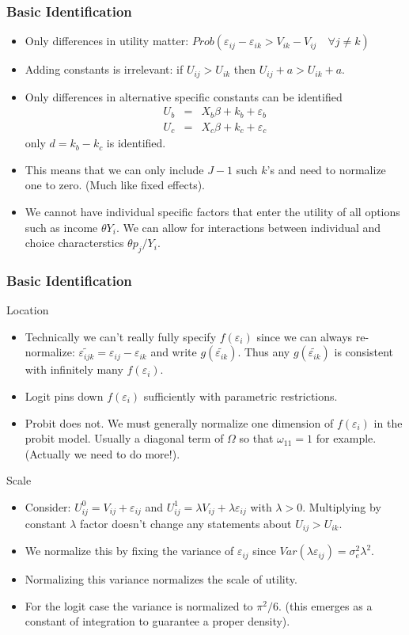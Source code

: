 \documentclass[xcolor=pdftex,dvipsnames,table,mathserif]{beamer}
\begin{document}
\begin{frame}
\frametitle{Basic Identification}
\small
\begin{itemize}
\item Only differences in utility matter: $Prob( \varepsilon_{ij}-\varepsilon_{ik} > V_{ik} - V_{ij} \quad \forall j \neq k)$
\item Adding constants is irrelevant: if $U_{ij} > U_{ik}$ then $U_{ij} + a > U_{ik} + a$.
\item Only differences in alternative specific constants can be identified
\begin{eqnarray*}
U_b &=& X_b \beta + k_b  + \varepsilon_b\\
U_c &=& X_c \beta + k_c  + \varepsilon_c
\end{eqnarray*}
only $d = k_b - k_c$ is identified.
\item This means that we can only include $J-1$ such $k$'s and need to normalize one to zero. (Much like fixed effects).
\item We cannot have individual specific factors that enter the utility of all options such as income $\theta Y_i$. We can allow for interactions between individual and choice characterstics $\theta p_{j}/ Y_i$.
\end{itemize}
\end{frame}

\begin{frame}
\frametitle{Basic Identification}
Location
\begin{itemize}
\item Technically we can't really fully specify $f(\varepsilon_i)$ since we can always re-normalize: $\widetilde{\varepsilon_{ijk}} = \varepsilon_{ij} - \varepsilon_{ik}$ and write $g(\widetilde{\varepsilon_{ik}})$. Thus any $g(\widetilde{\varepsilon_{ik}})$ is consistent with infinitely many $f(\varepsilon_i)$.
\item Logit pins down $f(\varepsilon_i)$ sufficiently with parametric restrictions.
\item Probit does not. We must generally normalize one dimension of $f(\varepsilon_i)$ in the probit model. Usually a diagonal term of $\Omega$ so that $\omega_{11} =1$ for example. (Actually we need to do more!).
\end{itemize}
Scale
\begin{itemize}
\item Consider: $U_{ij}^0 = V_{ij} + \varepsilon_{ij}$ and  $U_{ij}^1 = \lambda V_{ij} + \lambda \varepsilon_{ij}$ with $\lambda > 0$. Multiplying by constant $\lambda$ factor doesn't change any statements about $U_{ij} > U_{ik}$.
\item We normalize this by fixing the variance of $\varepsilon_{ij}$ since $Var(\lambda \varepsilon_{ij} ) = \sigma_e^2 \lambda^2$.
\item Normalizing this variance normalizes the scale of utility.
\item For the logit case the variance is normalized to $\pi^2/6$. (this emerges as a constant of integration to guarantee a proper density).
\end{itemize}
\end{frame}
\end{document}
